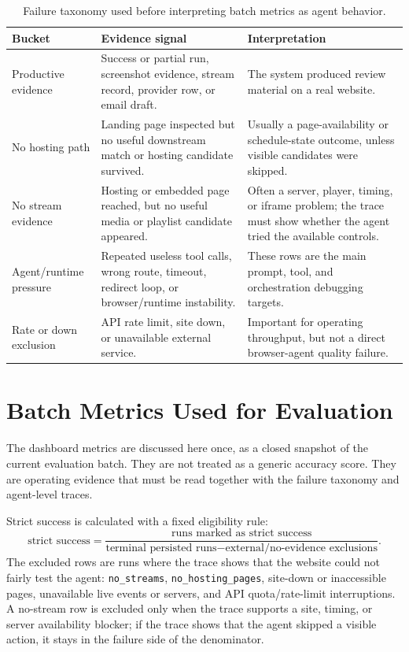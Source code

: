 \begin{table}[!htbp]
\centering
\small
\begin{tabularx}{\textwidth}{Q{3.1cm}Y Y}
\toprule
{}
Bucket & Evidence signal & Interpretation \\
\midrule
Productive evidence & Success or partial run, screenshot evidence, stream record,
provider row, or email draft. & The system produced review material on a real website. \\
No hosting path & Landing page inspected but no useful downstream match or hosting
candidate survived. & Usually a page-availability or schedule-state outcome, unless
visible candidates were skipped. \\
No stream evidence & Hosting or embedded page reached, but no useful media or playlist
candidate appeared. & Often a server, player, timing, or iframe problem; the trace
must show whether the agent tried the available controls. \\
Agent/runtime pressure & Repeated useless tool calls, wrong route, timeout, redirect
loop, or browser/runtime instability. & These rows are the main prompt, tool, and
orchestration debugging targets. \\
Rate or down exclusion & API rate limit, site down, or unavailable external service. &
Important for operating throughput, but not a direct browser-agent quality failure. \\
\bottomrule
\end{tabularx}
\caption{Failure taxonomy used before interpreting batch metrics as agent behavior.}
\label{tab:eval-failure-taxonomy}
\end{table}

\section{Batch Metrics Used for Evaluation}

The dashboard metrics are discussed here once, as a closed snapshot of the current
evaluation batch. They are not treated as a generic accuracy score. They are operating
evidence that must be read together with the failure taxonomy and agent-level traces.

Strict success is calculated with a fixed eligibility rule:
\[
  \text{strict success}
  =
  \frac{\text{runs marked as strict success}}
       {\text{terminal persisted runs} -
       \text{external/no-evidence exclusions}}.
\]
The excluded rows are runs where the trace shows that the website could not fairly test
the agent: \texttt{no\_streams}, \texttt{no\_hosting\_pages}, site-down or inaccessible
pages, unavailable live events or servers, and API quota/rate-limit interruptions. A
no-stream row is excluded only when the trace supports a site, timing, or server
availability blocker; if the trace shows that the agent skipped a visible action, it
stays in the failure side of the denominator.

